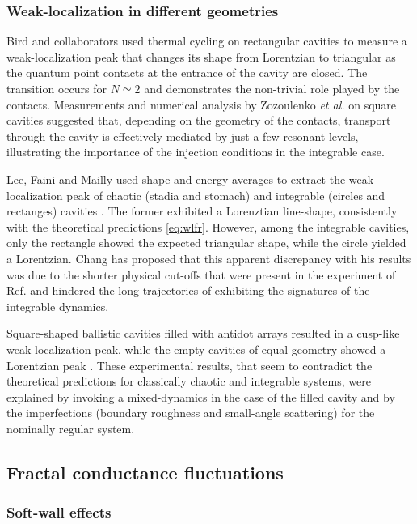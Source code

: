 \documentclass[a4paper,10pt]{article}
\newcommand{\nin}{\noindent}
\begin{document}
\subsubsection{Weak-localization in different geometries}
\label{subsec:wlde}

\nin Bird and collaborators \cite{bird} used thermal cycling on rectangular
cavities to measure a weak-localization peak that changes its
shape from Lorentzian to triangular as the quantum
point contacts at the entrance of the cavity are closed. The
transition occurs for $N \simeq 2$ and demonstrates the
non-trivial role played by the contacts. Measurements and numerical analysis by Zozoulenko {\em et al.} \cite{zozou97} on square cavities suggested that, depending on the geometry of the contacts, transport through the cavity is effectively mediated by just a few resonant levels, illustrating the importance of the injection conditions in the integrable case.

\nin Lee, Faini and Mailly used shape and energy averages to
extract the weak-localization peak of chaotic (stadia and
stomach) and integrable (circles and rectanges) cavities \cite{lee97}.
The former exhibited a Lorenztian line-shape, consistently
with the theoretical predictions \eqref{eq:wlfr}. However, among the integrable cavities, only the rectangle showed the expected triangular
shape, while the circle yielded a Lorentzian. Chang has proposed
\cite{chang97} that this apparent discrepancy with his results was
due to the shorter physical cut-offs that were present in the experiment of Ref. \cite{lee97} and hindered the long trajectories of exhibiting the signatures of the integrable dynamics.

\nin Square-shaped ballistic cavities filled with antidot arrays resulted in a cusp-like weak-localization peak, while the empty cavities of equal geometry showed a Lorentzian peak \cite{lutj}. These experimental results, that seem to contradict the theoretical predictions for classically chaotic and integrable systems, were explained by invoking a mixed-dynamics in the case of the filled cavity and by the imperfections (boundary roughness and small-angle scattering) for the nominally regular system.  

\subsection{Fractal conductance fluctuations}
\label{subsec:fcf}

\subsubsection{Soft-wall effects}
\label{subsubsec:swe}
\end{document}

